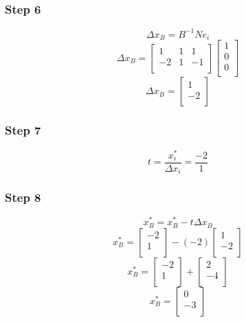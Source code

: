 \documentclass[14pt]{extarticle}
\begin{document}
\subsubsection*{Step 6}
\[
    \Delta x_B = B^{-1}N e_i
\]
\[
    \Delta x_B =
    \begin{bmatrix}
        1 & 1 & 1 \\
        -2 & 1 & -1 \\
    \end{bmatrix}
    \begin{bmatrix}
        1 \\
        0 \\
        0 \\
    \end{bmatrix}
\]
\[
    \Delta x_B =
    \begin{bmatrix}
        1 \\
        -2 \\
    \end{bmatrix}
\]

\subsubsection*{Step 7}
\[
    t = \frac{x^*_i}{\Delta x_i} = \frac{-2}{1}
\]

\subsubsection*{Step 8}
\[
    x^*_B = x^*_B - t \Delta x_B
\]
\[
    x^*_B = \begin{bmatrix}
        -2 \\
        1 \\
    \end{bmatrix}
    - (-2) \begin{bmatrix}
        1 \\
        -2 \\
    \end{bmatrix}
\]
\[
    x^*_B = \begin{bmatrix}
        -2 \\
        1 \\
    \end{bmatrix}
    + \begin{bmatrix}
        2 \\
        -4 \\
    \end{bmatrix}
\]
\[
    x^*_B = \begin{bmatrix}
        0 \\
        -3 \\
    \end{bmatrix}
\]
\end{document}
